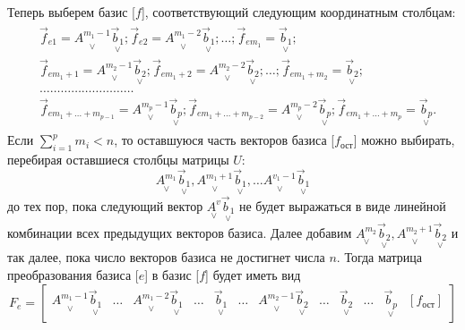 Теперь выберем базис [$f$], соответствующий следующим координатным столбцам:
\begin{gather}
\begin{split}
	&\vec{f}_{e1}=\underset{\lor}{A^{m_1-1}}\underset{\lor}{\vec{b}_1}; \vec{f}_{e2}=\underset{\lor}{A^{m_1-2}}\underset{\lor}{\vec{b}_1};\dots; \vec{f}_{em_1}=\underset{\lor}{\vec{b}_1};\\
	&\vec{f}_{em_1+1}=\underset{\lor}{A^{m_2-1}}\underset{\lor}{\vec{b}_2}; \vec{f}_{em_1+2}=\underset{\lor}{A^{m_2-2}}\underset{\lor}{\vec{b}_2};\dots; \vec{f}_{em_1+m_2}=\underset{\lor}{\vec{b}_2};\\
	&\dots\dots\dots\dots\dots\dots\dots\dots\dots\\
	&\vec{f}_{em_1+\dots+m_{p-1}}=\underset{\lor}{A^{m_p-1}}\underset{\lor}{\vec{b}_p}; \vec{f}_{em_1+\dots+m_{p-2}}=\underset{\lor}{A^{m_p-2}}\underset{\lor}{\vec{b}_p}; \vec{f}_{em_1+\dots+m_p}=\underset{\lor}{\vec{b}_p}.
\end{split}
\end{gather}
Если $\sum_{i=1}^{p}m_i<n$, то оставшуюся часть векторов базиса [$f_{\text{ост}}$] можно выбирать, перебирая оставшиеся столбцы матрицы $U$:
\begin{equation*}
	\underset{\lor}{A^{m_1}}\underset{\lor}{\vec{b}_1},	\underset{\lor}{A^{m_1+1}}\underset{\lor}{\vec{b}_1},\dots	\underset{\lor}{A^{v_1-1}}\underset{\lor}{\vec{b}_1}
\end{equation*}
до тех пор, пока следующий вектор $	\underset{\lor}{A^v}\underset{\lor}{\vec{b}_1}$ не будет выражаться в виде линейной комбинации всех предыдущих векторов базиса. Далее добавим $\underset{\lor}{A^{m_2}}\underset{\lor}{\vec{b}_2},\underset{\lor}{A^{m_2+1}}\underset{\lor}{\vec{b}_2}$ и так далее, пока число векторов базиса не достигнет числа $n$. Тогда матрица преобразования базиса [$e$] в базис [$f$] будет иметь вид
\begin{equation*}
	F_e=
	\begin{bmatrix}
	\underset{\lor}{A^{m_1-1}}\underset{\lor}{\vec{b}_1} & \dots & \underset{\lor}{A^{m_1-2}}\underset{\lor}{\vec{b}_1} & \dots & \underset{\lor}{\vec{b}_1} & \dots & \underset{\lor}{A^{m_2-1}}\underset{\lor}{\vec{b}_2} & \dots & \underset{\lor}{\vec{b}_2} & \dots & \underset{\lor}{\vec{b}_p} & [f_\text{ост}]
	\end{bmatrix}
\end{equation*}

